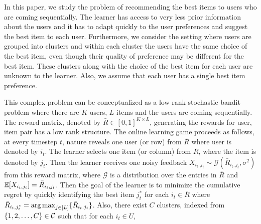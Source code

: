 In this paper, we study the problem of recommending the best items to users who are coming sequentially. The learner has access to very less prior information about the users and it has to adapt quickly to the user preferences and suggest the best item to each user. Furthermore, we consider the setting where users are grouped into clusters and within each cluster the users have the same choice of the best item, even though their quality of preference may be different for the best item. These clusters along with the choice of the best item for each user are unknown to the learner.  Also, we assume that each user has a single best item preference.

	This complex problem can be conceptualized as a low rank stochastic bandit problem where there are $K$ users, $L$ items and the users are coming sequentially. The reward matrix, denoted by $\bar{R}\in [0,1]^{K\times L}$,  generating the rewards for user, item pair has a low rank structure. The online learning game proceeds as follows, at every timestep $t$,  nature reveals one user (or row) from $\bar{R}$ where user is denoted by $i_t$. The learner selects one item (or column) from $\bar{R}$, where the item is denoted by $j_t$. Then the learner receives one noisy feedback $X_{i_t,j_t}\sim\mathcal{G}(\bar{R}_{i_t,j_t},\sigma^2)$ from this reward matrix, where $\mathcal{G}$ is a distribution over the entries in $\bar{R}$ and $\mathbb{E}[X_{i_t,j_t}] = \bar{R}_{i_t,j_t}$. Then the goal of the learner is to minimize the cumulative regret by quickly identifying the best item $j^*_t$ for each $i_t\in \bar{R}$ where $\bar{R}_{i_t,j^*_t} = \mathop{\rm arg\,max} _{j\in[L]}\lbrace \bar{R}_{i_t,j_t} \rbrace$. Also, there exist $C$ clusters, indexed from $\lbrace 1,2,\ldots, C\rbrace \in\mathcal{C}$ such that for each $i_t\in U$, 